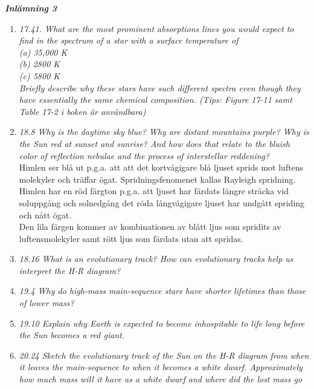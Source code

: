 \documentclass[./exercises.tex]{subfiles}
\begin{document}
\textit{\textbf{Inlämning 3  } }
\begin{enumerate}

\item \textit{17.41. What are the most prominent absorptions lines you would expect to find in the 
spectrum of a star with a surface temperature of}\\ 
\textit{(a) 35,000 K}\\
\textit{(b) 2800 K }\\
\textit{(c) 5800 K }\\

\textit{Briefly describe why these stars have such different spectra even though they have 
essentially the same chemical composition.  
(Tips: Figure 17-11 samt Table 17-2 i boken är användbara)}

\item\textit{18.8 Why is the daytime sky blue? Why are distant mountains purple? Why is the Sun red at 
sunset and sunrise? And how does that relate to the bluish color of reflection nebulae and 
the process of interstellar reddening?}\\

Himlen ser blå ut p.g.a. att att det kortvågigare blå ljuset sprids mot luftens molekyler och träffar ögat.
Spridningsfenomenet kallas Rayleigh spridning.
Himlen har en röd färgton p.g.a. att ljuset har färdats längre sträcka vid soluppgång och solnedgång det röda långvågigare ljuset har undgått spriding och nått ögat.\\
Den lila färgen kommer av kombinationen av blått ljus som spridits av luftensmolekyler samt rött ljus som färdats
utan att spridas. 


\item\textit{18.16 What is an evolutionary track? How can evolutionary tracks help us interpret the H-R 
diagram?}\\

\item\textit{19.4 Why do high-mass main-sequence stars have shorter lifetimes than those of lower 
mass?}\\
 
\item\textit{19.10 Explain why Earth is expected to become inhospitable to life long before the Sun 
becomes a red giant.}\\

\item\textit{20.24 Sketch the evolutionary track of the Sun on the H-R diagram from when it leaves the 
main-sequence to when it becomes a white dwarf.  Approximately how much mass will it 
have as a white dwarf and where did the lost mass go}\\
 

\end{enumerate}
\end{document}
